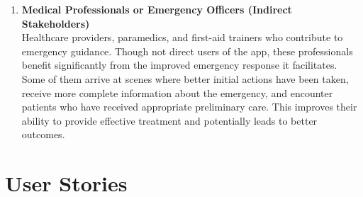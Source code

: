 \begin{enumerate}
    \item \textbf{Medical Professionals or Emergency Officers (Indirect Stakeholders)} \\
    Healthcare providers, paramedics, and first-aid trainers who contribute to emergency guidance. Though not direct users of the app, these professionals benefit significantly from the improved emergency response it facilitates. Some of them arrive at scenes where better initial actions have been taken, receive more complete information about the emergency, and encounter patients who have received appropriate preliminary care. This improves their ability to provide effective treatment and potentially leads to better outcomes.
\end{enumerate}

\section{User Stories}
\label{section:user-stories}
